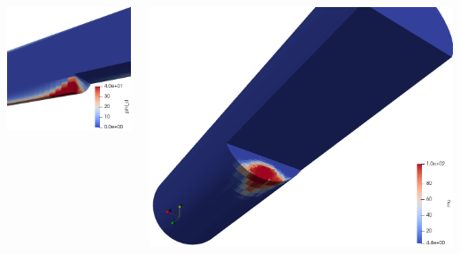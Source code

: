 \documentclass[
    14pt,
    xcolor=dvipsnames,
    aspectratio=169
]{beamer}
\begin{document}
\begin{frame}
    \begin{columns}[T]
        \begin{column}{0.3\textwidth}
            \centering
            \includegraphics[width=1.0\textwidth]{./images/slides/blood_step_1.png}
        \end{column}
        \begin{column}{0.7\textwidth}
            \centering
            \includegraphics[width=1.0\textwidth]{./images/slides/blood_step_2.png}
        \end{column}
    \end{columns}
\end{frame}
\end{document}
